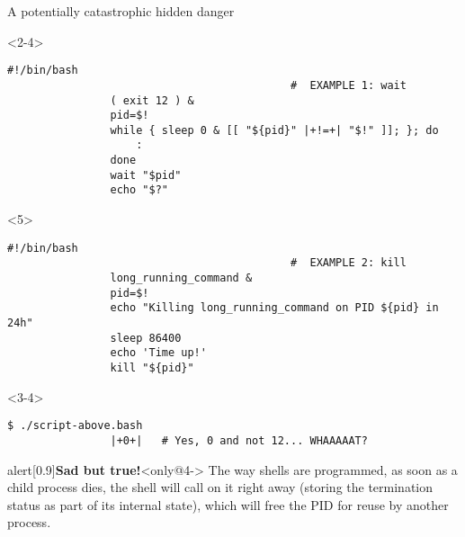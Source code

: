 \begin{frame}[fragile]{A potentially catastrophic hidden danger}
    \begin{overlayarea}{\textwidth}{0.5\textheight}
        \begin{onlyenv}<2-4>
            \begin{lstlisting}[style=MyBash]
                #!/bin/bash
                                            #  EXAMPLE 1: wait
                ( exit 12 ) &
                pid=$!
                while { sleep 0 & [[ "${pid}" |+!=+| "$!" ]]; }; do
                    :
                done
                wait "$pid"
                echo "$?"
            \end{lstlisting}
        \end{onlyenv}
        \begin{onlyenv}<5>
            \begin{lstlisting}[style=MyBash, emph={[8]long_running_command}, firstnumber=10]
                #!/bin/bash
                                            #  EXAMPLE 2: kill
                long_running_command &
                pid=$!
                echo "Killing long_running_command on PID ${pid} in 24h"
                sleep 86400
                echo 'Time up!'
                kill "${pid}"
            \end{lstlisting}
            \begin{center}
                \Large {}
            \end{center}
        \end{onlyenv}
        \begin{uncoverenv}<3-4>
            \begin{lstlisting}[style=MyBash, numbers=none, aboveskip=1mm]
                $ ./script-above.bash
                |+0+|   # Yes, 0 and not 12... WHAAAAAT?
            \end{lstlisting}
        \end{uncoverenv}
        \begin{center}
        \end{center}
    \end{overlayarea}
    \begin{varblock}{alert}[0.9\textwidth]{\textbf{Sad but true!}}<only@4->
        The way shells are programmed, as soon as a child process dies, the shell will call  on it right away (storing the termination status as part of its internal state), which will free the PID for reuse by another process.
    \end{varblock}
\end{frame}
